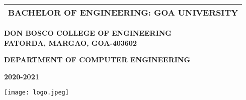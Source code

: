 \begin{titlepage}
    \begin{center}
        \begin{tabular}{|c|}
            \hline
                \Large
                BACHELOR OF ENGINEERING: GOA UNIVERSITY\\
            \hline
        \end{tabular}

        \Large
        \textbf{DON BOSCO COLLEGE OF ENGINEERING}\\
        \textbf{FATORDA, MARGAO, GOA-403602}

        \normalsize
        \textbf{DEPARTMENT OF COMPUTER ENGINEERING}\\

        \vspace*{0.4cm}
        
        \large
        \textbf{2020-2021}
        
        \texttt{[image: logo.jpeg]}

    \end{center}
\end{titlepage}